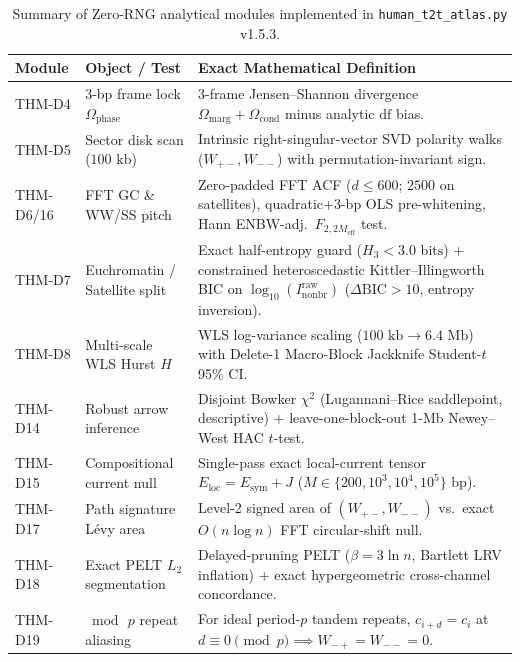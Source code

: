 \documentclass[11pt,a4paper]{article}
\newcommand{\Wmp}{W_{-+}}
\newcommand{\Wmm}{W_{--}}
\newcommand{\Inbraw}{I_{\mathrm{nonbr}}^{\mathrm{raw}}}
\newcommand{\Hthree}{H_3}
\newcommand{\dBIC}{\Delta\mathrm{BIC}}
\begin{document}
\begin{table}[htbp]
\centering
\caption{Summary of Zero-RNG analytical modules implemented in \texttt{human\_t2t\_atlas.py} v1.5.3.}
\label{tab:theorems}
\footnotesize
\begin{tabularx}{\textwidth}{@{}llX@{}}
\toprule
\textbf{Module} & \textbf{Object / Test} & \textbf{Exact Mathematical Definition} \\
\midrule
THM-D4 & 3-bp frame lock $\Omega_{\mathrm{phase}}$ & 3-frame Jensen--Shannon divergence $\Omega_{\mathrm{marg}}+\Omega_{\mathrm{cond}}$ minus analytic $\mathrm{df}$ bias. \\
THM-D5 & Sector disk scan ($100\text{ kb}$) & Intrinsic right-singular-vector SVD polarity walks ($W_{+-}, W_{--}$) with permutation-invariant sign. \\
THM-D6/16 & FFT GC \& WW/SS pitch & Zero-padded FFT ACF ($d\le 600$; $2500$ on satellites), quadratic+3-bp OLS pre-whitening, Hann ENBW-adj.\ $F_{2,2M_{\mathrm{eff}}}$ test. \\
THM-D7 & Euchromatin / Satellite split & Exact half-entropy guard ($\Hthree<3.0\text{ bits}$) + constrained heteroscedastic Kittler--Illingworth BIC on $\log_{10}(\Inbraw)$ ($\dBIC>10$, entropy inversion). \\
THM-D8 & Multi-scale WLS Hurst $H$ & WLS log-variance scaling ($100\text{ kb}\to 6.4\text{ Mb}$) with Delete-1 Macro-Block Jackknife Student-$t$ 95\% CI. \\
THM-D14 & Robust arrow inference & Disjoint Bowker $\chi^2$ (Lugannani--Rice saddlepoint, descriptive) + leave-one-block-out 1-Mb Newey--West HAC $t$-test. \\
THM-D15 & Compositional current null & Single-pass exact local-current tensor $E_{\mathrm{loc}} = E_{\mathrm{sym}} + J$ ($M \in \{200,10^3,10^4,10^5\}\text{ bp}$). \\
THM-D17 & Path signature L\'evy area & Level-2 signed area of $(W_{+-},W_{--})$ vs.\ exact $O(n\log n)$ FFT circular-shift null. \\
THM-D18 & Exact PELT $L_2$ segmentation & Delayed-pruning PELT ($\beta = 3\ln n$, Bartlett LRV inflation) + exact hypergeometric cross-channel concordance. \\
THM-D19 & $\bmod\,p$ repeat aliasing & For ideal period-$p$ tandem repeats, $c_{i+d}=c_i$ at $d\equiv 0\pmod p \implies \Wmp=\Wmm=0$. \\
\bottomrule
\end{tabularx}
\end{table}
\end{document}

